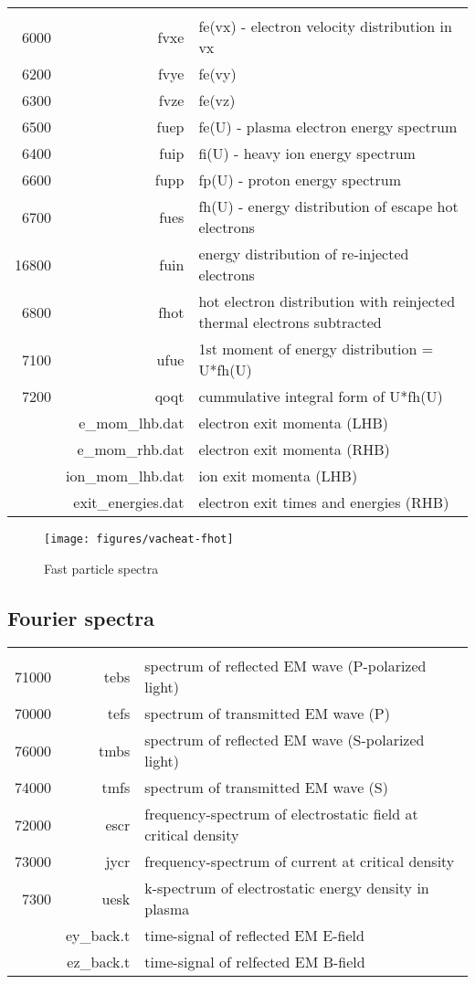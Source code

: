 \documentclass[11pt]{article}
\begin{document}
\begin{tabular}{rrl}
\hline\\
6000 & fvxe& fe(vx) - electron velocity distribution in vx \\
6200 & fvye& fe(vy) \\
6300 & fvze& fe(vz) \\
6500 & fuep& fe(U) - plasma electron energy spectrum \\
6400 & fuip& fi(U) - heavy ion energy spectrum \\
6600 & fupp& fp(U) - proton energy spectrum \\
6700 & fues& fh(U) - energy distribution of escape hot electrons \\ 
16800 & fuin& energy distribution of re-injected electrons \\
6800 & fhot& hot electron distribution with reinjected thermal electrons subtracted\\ 
7100 & ufue& 1st moment of energy distribution = U*fh(U) \\
7200 & qoqt& cummulative integral form of U*fh(U) \\
& e\_mom\_lhb.dat& electron exit momenta (LHB) \\
& e\_mom\_rhb.dat& electron exit momenta (RHB) \\
& ion\_mom\_lhb.dat& ion exit momenta (LHB) \\
& exit\_energies.dat& electron exit times and energies (RHB)
\end{tabular}

\begin{figure}[ht]
\begin{center}
\texttt{[image: figures/vacheat-fhot]}
\caption{Fast particle spectra}
\end{center}
\end{figure}

\subsection{Fourier spectra} 
\begin{tabular}{rrl}
\hline\\ 
71000 & tebs& spectrum of reflected EM wave (P-polarized light) \\
70000 & tefs& spectrum of transmitted EM wave (P) \\
76000 & tmbs& spectrum of reflected EM wave (S-polarized light)\\ 
74000 & tmfs& spectrum of transmitted EM wave (S) \\
72000 & escr& frequency-spectrum of electrostatic field at critical density \\
73000 & jycr& frequency-spectrum of current at critical density \\
7300 & uesk& k-spectrum of electrostatic energy density in plasma \\
& ey\_back.t& time-signal of reflected EM E-field \\
& ez\_back.t& time-signal of relfected EM B-field
\end{tabular}
\end{document}
